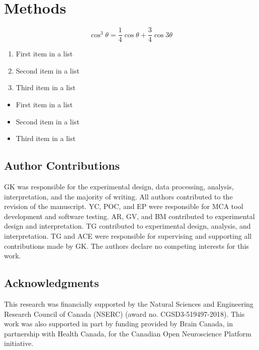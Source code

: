 \documentclass[fleqn,10pt]{SelfArx} %
\begin{document}
\section*{Methods}
\begin{equation}
\cos^3 \theta =\frac{1}{4}\cos\theta+\frac{3}{4}\cos 3\theta
\label{eq:refname2}
\end{equation}

\lipsum[10] %

\begin{enumerate}[noitemsep] %
\item First item in a list
\item Second item in a list
\item Third item in a list
\end{enumerate}

\lipsum[14] %

\begin{itemize}[noitemsep] %
\item First item in a list
\item Second item in a list
\item Third item in a list
\end{itemize}

\subsection*{Author Contributions}
GK was responsible for the experimental design, data processing, analysis, interpretation, and the majority of writing.
All authors contributed to the revision of the manuscript. YC, POC, and EP were responsible for MCA tool development
and software testing. AR, GV, and BM contributed to experimental design and interpretation. TG contributed to
experimental design, analysis, and interpretation. TG and ACE were responsible for supervising and supporting all
contributions made by GK. The authors declare no competing interests for this work.

\subsection*{Acknowledgments} 
This research was financially supported by the Natural Sciences and Engineering Research Council of Canada (NSERC)
(award no. CGSD3-519497-2018). This work was also supported in part by funding provided by Brain Canada, in partnership
with Health Canada, for the Canadian Open Neuroscience Platform initiative.
\end{document}
